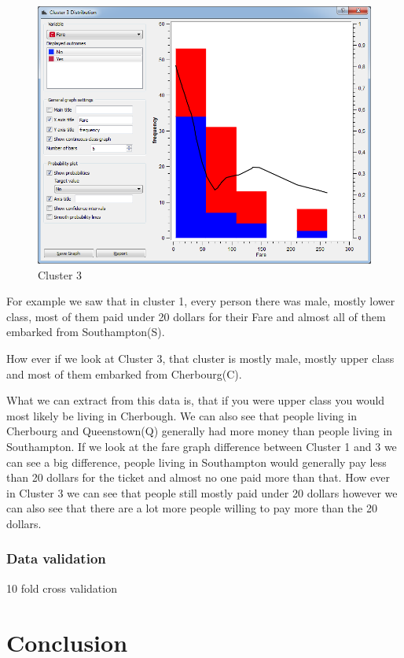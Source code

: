 \documentclass[a4paper,11pt]{article}
\begin{document}
\begin{figure}[h]
\begin{center}
		\includegraphics[scale=0.30]{ClusterDistribution/Cluster3/Fare}
	\end{center}
	\caption{Cluster 3}
	\label{ClusterThree}
\end{figure}


For example we saw that in cluster 1, every person there was male, mostly lower class, most of them paid under 20 dollars for their Fare and almost all of them embarked from Southampton(S).

How ever if we look at Cluster 3, that cluster is mostly male, mostly upper class and most of them embarked from Cherbourg(C).

What we can extract from this data is, that if you were upper class you would most likely be living in Cherbough.
We can also see that people living in Cherbourg and Queenstown(Q) generally had more money than people living in Southampton. If we look at the fare graph difference between Cluster 1 and 3 we can see a big difference, people living in Southampton would generally pay less than 20 dollars for the ticket and almost no one paid more than that. How ever in Cluster 3 we can see that people still mostly paid under 20 dollars however we can also see that there are a lot more people willing to pay more than the 20 dollars.




\subsubsection{Data validation}
10 fold cross validation
\clearpage
\section{Conclusion}
\end{document}

